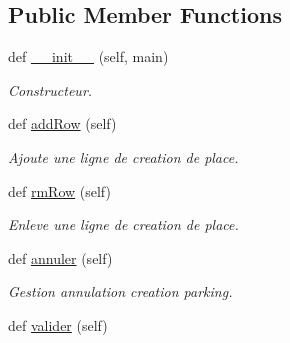 \subsection*{Public Member Functions}
\begin{DoxyCompactItemize}
\item 
def \hyperlink{classsrc_1_1c_1_1_parking_1_1_crea_parking_a0d39ee8fadb3d4910c62de4200b06b80}{\+\_\+\+\_\+init\+\_\+\+\_\+} (self, main)
\begin{DoxyCompactList}\small\item\em Constructeur. \end{DoxyCompactList}\item 
\hypertarget{classsrc_1_1c_1_1_parking_1_1_crea_parking_aa0ecb2929df07d31e3efb5ddc6222bda}{}def \hyperlink{classsrc_1_1c_1_1_parking_1_1_crea_parking_aa0ecb2929df07d31e3efb5ddc6222bda}{add\+Row} (self)\label{classsrc_1_1c_1_1_parking_1_1_crea_parking_aa0ecb2929df07d31e3efb5ddc6222bda}

\begin{DoxyCompactList}\small\item\em Ajoute une ligne de creation de place. \end{DoxyCompactList}\item 
\hypertarget{classsrc_1_1c_1_1_parking_1_1_crea_parking_a2182dc0d6222eaa275ea7bcc5da6d018}{}def \hyperlink{classsrc_1_1c_1_1_parking_1_1_crea_parking_a2182dc0d6222eaa275ea7bcc5da6d018}{rm\+Row} (self)\label{classsrc_1_1c_1_1_parking_1_1_crea_parking_a2182dc0d6222eaa275ea7bcc5da6d018}

\begin{DoxyCompactList}\small\item\em Enleve une ligne de creation de place. \end{DoxyCompactList}\item 
\hypertarget{classsrc_1_1c_1_1_parking_1_1_crea_parking_a5da40653d9419c65d19370729e6e077d}{}def \hyperlink{classsrc_1_1c_1_1_parking_1_1_crea_parking_a5da40653d9419c65d19370729e6e077d}{annuler} (self)\label{classsrc_1_1c_1_1_parking_1_1_crea_parking_a5da40653d9419c65d19370729e6e077d}

\begin{DoxyCompactList}\small\item\em Gestion annulation creation parking. \end{DoxyCompactList}\item 
\hypertarget{classsrc_1_1c_1_1_parking_1_1_crea_parking_a88a98d634fc5046928c5db8c34708da4}{}def \hyperlink{classsrc_1_1c_1_1_parking_1_1_crea_parking_a88a98d634fc5046928c5db8c34708da4}{valider} (self)\label{classsrc_1_1c_1_1_parking_1_1_crea_parking_a88a98d634fc5046928c5db8c34708da4}


\end{DoxyCompactItemize}
